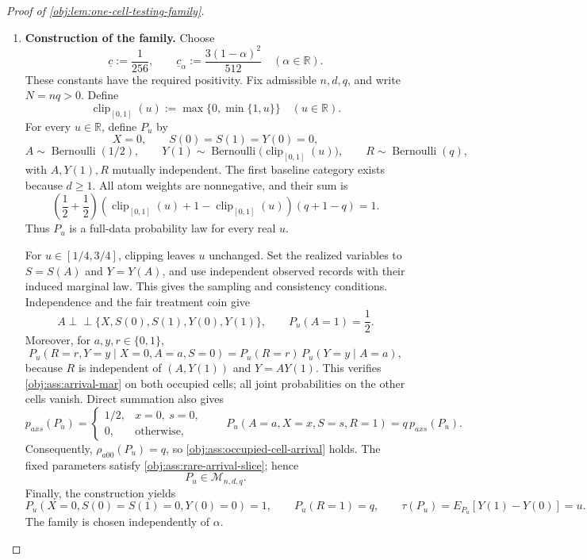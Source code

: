 \documentclass[11pt]{article}
\begin{document}
\begin{proof}[Proof of \cref{obj:lem:one-cell-testing-family}]
\begin{enumerate}
\item \textbf{Construction of the family.}
Choose
\[
\underline c:=\frac1{256},
\qquad
\underline c_\alpha:=\frac{3(1-\alpha)^2}{512}
\quad(\alpha\in\mathbb R).
\]
These constants have the required positivity. Fix admissible \(n,d,q\), and write \(N=nq>0\). Define
\[
\operatorname{clip}_{[0,1]}(u):=\max\{0,\min\{1,u\}\}
\quad(u\in\mathbb R).
\]
For every \(u\in\mathbb R\), define \(P_u\) by
\[
X=0,\qquad S(0)=S(1)=Y(0)=0,
\]
\[
A\sim\operatorname{Bernoulli}(1/2),\qquad
Y(1)\sim\operatorname{Bernoulli}
       \bigl(\operatorname{clip}_{[0,1]}(u)\bigr),\qquad
R\sim\operatorname{Bernoulli}(q),
\]
with \(A,Y(1),R\) mutually independent. The first baseline category exists because \(d\ge1\). All atom weights are nonnegative, and their sum is
\[
\left(\frac12+\frac12\right)
\left(\operatorname{clip}_{[0,1]}(u)
      +1-\operatorname{clip}_{[0,1]}(u)\right)
\left(q+1-q\right)=1.
\]
Thus \(P_u\) is a full-data probability law for every real \(u\).

For \(u\in[1/4,3/4]\), clipping leaves \(u\) unchanged. Set the realized variables to \(S=S(A)\) and \(Y=Y(A)\), and use independent observed records with their induced marginal law. This gives the sampling and consistency conditions. Independence and the fair treatment coin give
\[
A\perp\!\!\!\perp
  \{X,S(0),S(1),Y(0),Y(1)\},
\qquad P_u(A=1)=\frac12.
\]
Moreover, for \(a,y,r\in\{0,1\}\),
\[
P_u(R=r,Y=y\mid X=0,A=a,S=0)
=
P_u(R=r)\,P_u(Y=y\mid A=a),
\]
because \(R\) is independent of \((A,Y(1))\) and \(Y=AY(1)\). This verifies \cref{obj:ass:arrival-mar} on both occupied cells; all joint probabilities on the other cells vanish. Direct summation also gives
\[
p_{axs}(P_u)=
\begin{cases}
1/2,&x=0,\ s=0,\\
0,&\text{otherwise},
\end{cases}
\qquad
P_u(A=a,X=x,S=s,R=1)=q\,p_{axs}(P_u).
\]
Consequently, \(\rho_{a00}(P_u)=q\), so
\cref{obj:ass:occupied-cell-arrival} holds. The fixed parameters satisfy
\cref{obj:ass:rare-arrival-slice}; hence
\[
P_u\in\mathcal M_{n,d,q}.
\]
Finally, the construction yields
\[
P_u\!\left(X=0,S(0)=S(1)=0,Y(0)=0\right)=1,
\qquad P_u(R=1)=q,
\qquad
\tau(P_u)=E_{P_u}[Y(1)-Y(0)]=u.
\]
The family is chosen independently of \(\alpha\).


\end{enumerate}
\end{proof}
\end{document}
